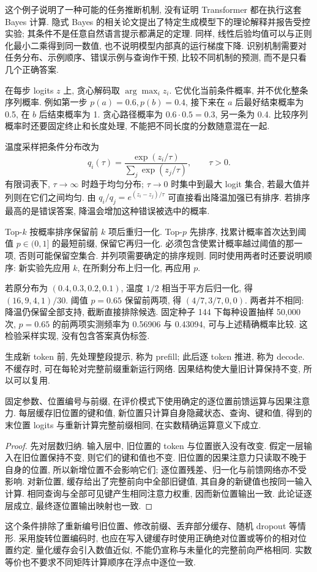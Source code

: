 这个例子说明了一种可能的任务推断机制, 没有证明 Transformer 都在执行这套 Bayes 计算. 隐式 Bayes 的相关论文提出了特定生成模型下的理论解释并报告受控实验\cite{iclbayes}; 其条件不是任意自然语言提示都满足的定理. 同样, 线性后验均值可以与正则化最小二乘得到同一数值, 也不说明模型内部真的运行梯度下降. 识别机制需要对任务分布、示例顺序、错误示例与查询作干预, 比较不同机制的预测, 而不是只看几个正确答案.

\label{sec:lm-sampling}
在每步 logits $z$ 上, 贪心解码取 $\arg\max_i z_i$. 它优化当前条件概率, 并不优化整条序列概率. 例如第一步 $p(a)=0.6,p(b)=0.4$, 接下来在 $a$ 后最好结束概率为 0.5, 在 $b$ 后结束概率为 1. 贪心路径概率为 $0.6\cdot0.5=0.3$, 另一条为 0.4. 比较序列概率时还要固定终止和长度处理, 不能把不同长度的分数随意混在一起.

温度采样把条件分布改为
\[
q_i(\tau)=\frac{\exp(z_i/\tau)}{\sum_j\exp(z_j/\tau)},\qquad\tau>0.
\]
有限词表下, $\tau\to\infty$ 时趋于均匀分布; $\tau\to0$ 时集中到最大 logit 集合, 若最大值并列则在它们之间均匀. 由 $q_i/q_j=e^{(z_i-z_j)/\tau}$ 可直接看出降温加强已有排序. 若排序最高的是错误答案, 降温会增加这种错误被选中的概率.

Top-$k$ 按概率排序保留前 $k$ 项后重归一化. Top-$p$ 先排序, 找累计概率首次达到阈值 $p\in(0,1]$ 的最短前缀, 保留它再归一化. 必须包含使累计概率越过阈值的那一项, 否则可能保留空集合. 并列项需要确定的排序规则. 同时使用两者时还要说明顺序: 新实验先应用 $k$, 在所剩分布上归一化, 再应用 $p$.

若原分布为 $(0.4,0.3,0.2,0.1)$, 温度 $1/2$ 相当于平方后归一化, 得 $(16,9,4,1)/30$. 阈值 $p=0.65$ 保留前两项, 得 $(4/7,3/7,0,0)$. 两者并不相同: 降温仍保留全部支持, 截断直接排除候选. 固定种子 144 下每种设置抽样 50,000 次, $p=0.65$ 的前两项实测频率为 0.56906 与 0.43094, 可与上述精确概率比较. 这检验采样实现, 没有包含答案真伪标签.

\label{sec:lm-cache}
生成新 token 前, 先处理整段提示, 称为 prefill; 此后逐 token 推进, 称为 decode. 不缓存时, 可在每轮对完整前缀重新运行网络. 因果结构使大量旧计算保持不变, 所以可以复用.

\begin{proposition}\label{prop:kv-equivalence}
固定参数、位置编号与前缀, 在评价模式下使用确定的逐位置前馈运算与因果注意力. 每层缓存旧位置的键和值, 新位置只计算自身隐藏状态、查询、键和值, 得到的末位置 logits 与重新计算完整前缀相同, 在实数精确运算意义下成立.
\end{proposition}
\begin{proof}
先对层数归纳. 输入层中, 旧位置的 token 与位置嵌入没有改变. 假定一层输入在旧位置保持不变, 则它们的键和值也不变. 旧位置的因果注意力只读取不晚于自身的位置, 所以新增位置不会影响它们; 逐位置残差、归一化与前馈网络亦不受影响. 对新位置, 缓存给出了完整前向中全部旧键值, 其自身的新键值也按同一输入计算. 相同查询与全部可见键产生相同注意力权重, 因而新位置输出一致. 此论证逐层成立, 最终逐位置输出映射也一致.
\end{proof}
这个条件排除了重新编号旧位置、修改前缀、丢弃部分缓存、随机 dropout 等情形. 采用旋转位置编码时, 也应在写入键缓存时使用正确绝对位置或等价的相对位置约定. 量化缓存会引入数值近似, 不能仍宣称与未量化的完整前向严格相同. 实数等价也不要求不同矩阵计算顺序在浮点中逐位一致.

